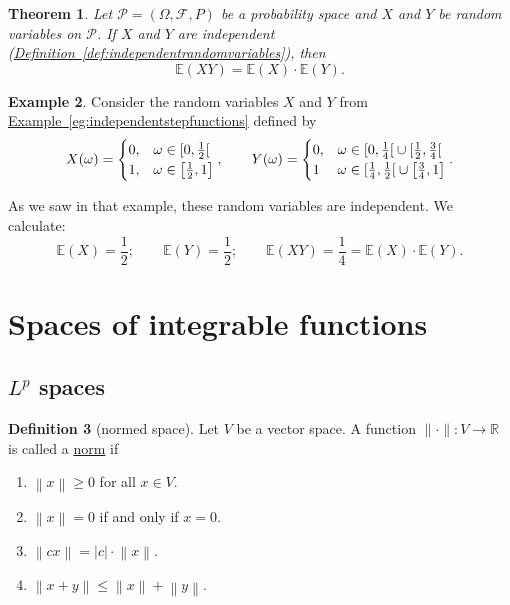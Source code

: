 \documentclass[a4paper,12pt]{scrreprt}
\newcommand{\R}{\mathbb{R}}
\newcommand{\E}{\mathbb{E}}
\newcommand{\defn}[1]{\ul{#1}}
\newcommand{\norm}[1]{\left\|#1\right\|}
\theoremstyle{definition}
\newtheorem{definition}{Definition}
\newtheorem{example}[definition]{Example}
\theoremstyle{plain}
\newtheorem{theorem}[definition]{Theorem}
\theoremstyle{remark}
\begin{document}
\begin{theorem}
  Let $\mathcal{P} = (\Omega, \mathcal{F}, P)$ be a probability space and $X$ and $Y$ be random variables on $\mathcal{P}$. If $X$ and $Y$ are independent (\hyperref[def:independentrandomvariables]{Definition~\ref*{def:independentrandomvariables}}), then
  \begin{equation*}
    \mathbb{E}(XY) = \mathbb{E}(X) \cdot \mathbb{E}(Y).
  \end{equation*}
\end{theorem}

\begin{example}
  Consider the random variables $X$ and $Y$ from \hyperref[eg:independentstepfunctions]{Example~\ref*{eg:independentstepfunctions}} defined by
  \begin{equation*}
    X(\omega) =
    \begin{cases}
      0, &\omega \in \interval[open right]{0}{\frac{1}{2}} \\
      1, &\omega \in \left[ \frac{1}{2}, 1 \right]
    \end{cases},
    \qquad
    Y(\omega) =
    \begin{cases}
      0, & \omega \in \interval[open right]{0}{\frac{1}{4}} \cup \interval[open right]{\frac{1}{2}}{\frac{3}{4}} \\
      1 & \omega \in \interval[open right]{\frac{1}{4}}{\frac{1}{2}} \cup \left[ \frac{3}{4}, 1 \right]
    \end{cases}.
  \end{equation*}

  As we saw in that example, these random variables are independent. We calculate:
  \begin{equation*}
    \E(X) = \frac{1}{2};\qquad \E(Y) = \frac{1}{2};\qquad \E(XY) = \frac{1}{4} = \E(X)\cdot \E(Y).
  \end{equation*}
\end{example}

\section{Spaces of integrable functions}
\subsection{\texorpdfstring{$L^{p}$}{Lg} spaces}
\begin{definition}[normed space]
  \label{def:normedspace}
  Let $V$ be a vector space. A function $\|\cdot\|\colon V \to \R$ is called a \defn{norm} if
  \begin{enumerate}
    \item $\norm{x} \geq 0$ for all $x \in V$.

    \item $\norm{x} = 0$ if and only if $x = 0$.

    \item $\norm{cx} = \left|c\right|\cdot\norm{x}$.

    \item $\norm{x+y} \leq \norm{x} + \norm{y}$.
  \end{enumerate}
\end{definition}
\end{document}
